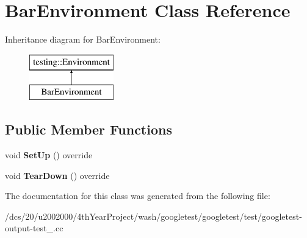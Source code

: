 \hypertarget{classBarEnvironment}{}\section{Bar\+Environment Class Reference}
\label{classBarEnvironment}
Inheritance diagram for Bar\+Environment\+:\begin{figure}[H]
\begin{center}
\leavevmode
\includegraphics[height=2.000000cm]{classBarEnvironment}
\end{center}
\end{figure}
\subsection*{Public Member Functions}
\begin{DoxyCompactItemize}
\item 
\mbox{\label{classBarEnvironment_a8c525317fe8067f5000475cf4689da09}} 
void {\bfseries Set\+Up} () override
\item 
\mbox{\label{classBarEnvironment_ac02b15d5b27e33232c578f0340442bbb}} 
void {\bfseries Tear\+Down} () override
\end{DoxyCompactItemize}


The documentation for this class was generated from the following file\+:\begin{DoxyCompactItemize}
\item 
/dcs/20/u2002000/4th\+Year\+Project/wash/googletest/googletest/test/googletest-\/output-\/test\+\_\+.\+cc\end{DoxyCompactItemize}
